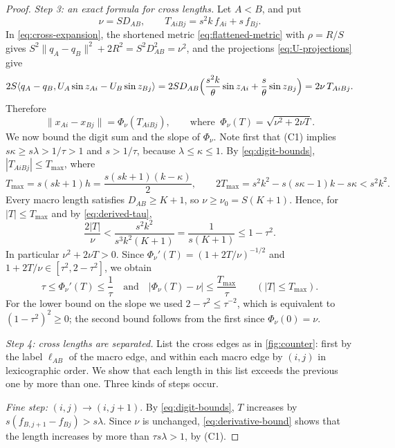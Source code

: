 \documentclass[11pt]{amsart}
\numberwithin{equation}{section}
\theoremstyle{definition}
\theoremstyle{remark}
\newcommand{\ip}[2]{\langle #1,#2\rangle}
\newcommand{\norm}[1]{\lVert #1\rVert}
\newcommand{\Tmax}{T_{\max}}
\newcommand{\cond}[1]{\textup{(C#1)}}
\begin{document}
\begin{proof}
\smallskip\noindent\emph{Step 3: an exact formula for cross lengths.}
Let $A<B$, and put
\begin{equation}\label{eq:cross-digits}
 \nu=SD_{AB},\qquad T_{AiBj}=s^2k\,f_{Ai}+s\,f_{Bj}.
\end{equation}
In \eqref{eq:cross-expansion}, the shortened metric
\eqref{eq:flattened-metric} with $\rho=R/S$ gives
$S^2\norm{q_A-q_B}^2+2R^2=S^2D_{AB}^2=\nu^2$, and the projections
\eqref{eq:U-projections} give
\[
 2S\ip{q_A-q_B}{U_A\sin z_{Ai}-U_B\sin z_{Bj}}
 =2SD_{AB}\Bigl(\frac{s^2k}\theta\sin z_{Ai}+\frac s\theta\sin z_{Bj}\Bigr)
 =2\nu\,T_{AiBj}.
\]
Therefore
\begin{equation}\label{eq:simple-cross}
 \norm{x_{Ai}-x_{Bj}}=\Phi_\nu(T_{AiBj}),
 \qquad\text{where }\ \Phi_\nu(T)=\sqrt{\nu^2+2\nu T}.
\end{equation}
We now bound the digit sum and the slope of $\Phi_\nu$. Note first that
\cond1 implies $s\kappa\ge s\lambda>1/\tau>1$ and $s>1/\tau$, because
$\lambda\le\kappa\le1$. By \eqref{eq:digit-bounds}, $|T_{AiBj}|\le\Tmax$,
where
\begin{equation}\label{eq:digit-budget}
 \Tmax=s(sk+1)h=\frac{s(sk+1)(k-\kappa)}2,
 \qquad
 2\Tmax=s^2k^2-s(s\kappa-1)k-s\kappa<s^2k^2.
\end{equation}
Every macro length satisfies $D_{AB}\ge K+1$, so $\nu\ge\nu_0=S(K+1)$.
Hence, for $|T|\le\Tmax$ and by \eqref{eq:derived-tau},
\[
 \frac{2|T|}{\nu}<\frac{s^2k^2}{s^3k^2(K+1)}=\frac1{s(K+1)}\le1-\tau^2.
\]
In particular $\nu^2+2\nu T>0$. Since
$\Phi_\nu'(T)=(1+2T/\nu)^{-1/2}$ and $1+2T/\nu\in[\tau^2,2-\tau^2]$, we
obtain
\begin{equation}\label{eq:derivative-bound}
 \tau\le\Phi_\nu'(T)\le\frac1\tau
 \quad\text{and}\quad
 |\Phi_\nu(T)-\nu|\le\frac{\Tmax}\tau
 \qquad(|T|\le\Tmax).
\end{equation}
For the lower bound on the slope we used $2-\tau^2\le\tau^{-2}$, which is
equivalent to $(1-\tau^2)^2\ge0$; the second bound follows from the first
since $\Phi_\nu(0)=\nu$.

\smallskip\noindent\emph{Step 4: cross lengths are separated.}
List the cross edges as in \cref{fig:counter}: first by the label
$\ell_{AB}$ of the macro edge, and within each macro edge by $(i,j)$ in
lexicographic order. We show that each length in this list exceeds the
previous one by more than one. Three kinds of steps occur.

\emph{Fine step:} $(i,j)\to(i,j+1)$. By \eqref{eq:digit-bounds}, $T$
increases by $s(f_{B,j+1}-f_{Bj})>s\lambda$. Since $\nu$ is unchanged,
\eqref{eq:derivative-bound} shows that the length increases by more than
$\tau s\lambda>1$, by \cond1.


\end{proof}
\end{document}
